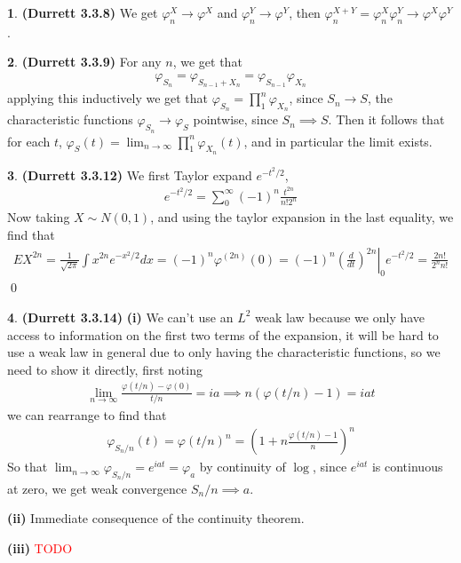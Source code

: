 \documentclass[10.5pt]{article}
\theoremstyle{definition}
\newtheorem{pb}{}
\begin{document}
    \begin{pb}\textbf{(Durrett 3.3.8)}
        We get \(\varphi_n^X \to \varphi^X\) and \(\varphi_n^Y \to \varphi^Y\), then \(\varphi_n^{X+Y} = \varphi_n^X \varphi_n^Y \to \varphi^X \varphi^Y\).
    \end{pb}
    \begin{pb}\textbf{(Durrett 3.3.9)}
        For any \(n\), we get that
        \begin{align*}
            \varphi_{S_n} = \varphi_{S_{n-1} + X_n} = \varphi_{S_{n-1}}\varphi_{X_n}
        \end{align*}
        applying this inductively we get that \(\varphi_{S_n} = \prod_1^n \varphi_{X_n}\), since \(S_n \to S\), the characteristic functions \(\varphi_{S_n} \to \varphi_S\) pointwise, since \(S_n \implies S\). Then it follows that for each \(t\), \(\varphi_S(t) = \lim_{n\to\infty} \prod_1^n \varphi_{X_n}(t)\), and in particular the limit exists.
    \end{pb}
    \begin{pb}\textbf{(Durrett 3.3.12)}
        We first Taylor expand \(e^{-t^2/2}\),
        \begin{align*}
            e^{-t^2/2} = \sum_0^\infty (-1)^n\frac{t^{2n}}{n!2^n}
        \end{align*}
        Now taking \(X \sim N(0,1)\), and using the taylor expansion in the last equality, we find that
        \begin{align*}
            EX^{2n} = \frac{1}{\sqrt{2\pi}}\int x^{2n}e^{-x^2/2}dx = (-1)^n \varphi^{(2n)}(0) = (-1)^n\left.\left(\frac{d}{dt}\right)^{2n}\right\vert_0 e^{-t^2/2} = \frac{2n!}{2^n n!}
        \end{align*} \qed
    \end{pb}
    \begin{pb}\textbf{(Durrett 3.3.14)} \textbf{(i)}
        We can't use an \(L^2\) weak law because we only have access to information on the first two terms of the expansion, it will be hard to use a weak law in general due to only having the characteristic functions, so we need to show it directly, first noting
        \begin{align*}
            \lim_{n\to\infty} \frac{\varphi(t/n) - \varphi(0)}{t/n} = ia \implies n(\varphi(t/n) - 1) = iat
        \end{align*}
        we can rearrange to find that
        \begin{align*}
            \varphi_{S_n/n}(t) = \varphi(t/n)^n = \left(1 + n\frac{\varphi(t/n) - 1}{n}\right)^n
        \end{align*}
        So that \(\lim_{n\to\infty} \varphi_{S_n/n} = e^{iat} = \varphi_a\) by continuity of \(\log\), since \(e^{iat}\) is continuous at zero, we get weak convergence \(S_n/n \implies a\).

        \textbf{(ii)} Immediate consequence of the continuity theorem.

        \textbf{(iii)} \textcolor{red}{TODO}
    \end{pb}
\end{document}
